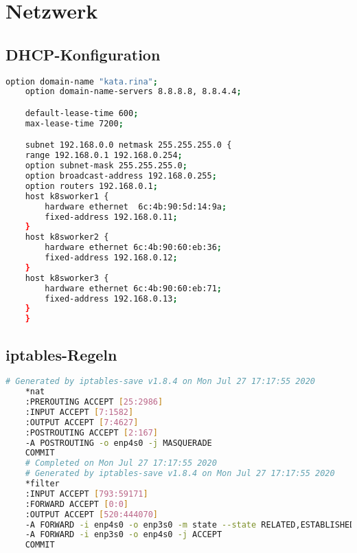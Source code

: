 \chapter{Netzwerk}

\section{DHCP-Konfiguration}
\hfill \newline
\label{app:dhcp}
\begin{lstlisting}[language=bash]
    option domain-name "kata.rina";
    option domain-name-servers 8.8.8.8, 8.8.4.4;

    default-lease-time 600;
    max-lease-time 7200;

    subnet 192.168.0.0 netmask 255.255.255.0 {
    range 192.168.0.1 192.168.0.254;
    option subnet-mask 255.255.255.0;
    option broadcast-address 192.168.0.255;
    option routers 192.168.0.1;
    host k8sworker1 {
        hardware ethernet  6c:4b:90:5d:14:9a;
        fixed-address 192.168.0.11;
    }
    host k8sworker2 {
        hardware ethernet 6c:4b:90:60:eb:36; 
        fixed-address 192.168.0.12;
    }
    host k8sworker3 {
        hardware ethernet 6c:4b:90:60:eb:71;
        fixed-address 192.168.0.13;
    }
    }
\end{lstlisting}
\newpage

\section{iptables-Regeln}
\hfill \newline
\label{app:iptables}
\begin{lstlisting}[language=bash]
    # Generated by iptables-save v1.8.4 on Mon Jul 27 17:17:55 2020
    *nat
    :PREROUTING ACCEPT [25:2986]
    :INPUT ACCEPT [7:1582]
    :OUTPUT ACCEPT [7:4627]
    :POSTROUTING ACCEPT [2:167]
    -A POSTROUTING -o enp4s0 -j MASQUERADE
    COMMIT
    # Completed on Mon Jul 27 17:17:55 2020
    # Generated by iptables-save v1.8.4 on Mon Jul 27 17:17:55 2020
    *filter
    :INPUT ACCEPT [793:59171]
    :FORWARD ACCEPT [0:0]
    :OUTPUT ACCEPT [520:444070]
    -A FORWARD -i enp4s0 -o enp3s0 -m state --state RELATED,ESTABLISHED -j ACCEPT
    -A FORWARD -i enp3s0 -o enp4s0 -j ACCEPT
    COMMIT
\end{lstlisting}